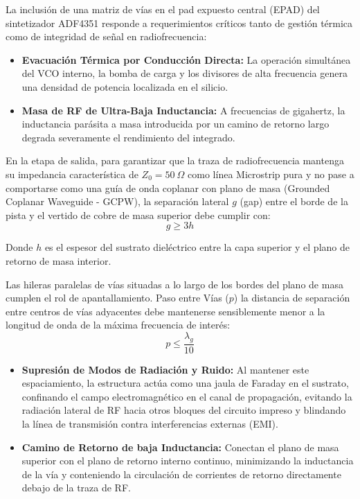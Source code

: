 \documentclass[11pt,a4paper,twoside]{report}
\begin{document}
	La inclusión de una matriz de vías en el pad expuesto central (EPAD) del sintetizador ADF4351 responde a requerimientos críticos tanto de gestión térmica como de integridad de señal en radiofrecuencia:
	\begin{itemize}
		\item \textbf{Evacuación Térmica por Conducción Directa:} La operación simultánea del VCO interno, la bomba de carga y los divisores de alta frecuencia genera una densidad de potencia localizada en el silicio.
		\item \textbf{Masa de RF de Ultra-Baja Inductancia:} A frecuencias de gigahertz, la inductancia parásita a masa introducida por un camino de retorno largo degrada severamente el rendimiento del integrado.
	\end{itemize}

	En la etapa de salida, para garantizar que la traza de radiofrecuencia mantenga su impedancia característica de $Z_0 = 50\ \Omega$ como línea Microstrip pura y no pase a comportarse como una guía de onda coplanar con plano de masa (Grounded Coplanar Waveguide - GCPW), la separación lateral $g$ (gap) entre el borde de la pista y el vertido de cobre de masa superior debe cumplir con:
	\begin{equation}
		g \ge 3h
	\end{equation}
	
	Donde $h$ es el espesor del sustrato dieléctrico entre la capa superior y el plano de retorno de masa interior.\newpage
	
	Las hileras paralelas de vías situadas a lo largo de los bordes del plano de masa cumplen el rol de apantallamiento. Paso entre Vías ($p$) la distancia de separación entre centros de vías adyacentes debe mantenerse sensiblemente menor a la longitud de onda de la máxima frecuencia de interés:
	\begin{equation}
			p \le \frac{\lambda_{g}}{10}
	\end{equation}

	\begin{itemize}
		\item \textbf{Supresión de Modos de Radiación y Ruido:} Al mantener este espaciamiento, la estructura actúa como una jaula de Faraday en el sustrato, confinando el campo electromagnético en el canal de propagación, evitando la radiación lateral de RF hacia otros bloques del circuito impreso y blindando la línea de transmisión contra interferencias externas (EMI).
		\item \textbf{Camino de Retorno de baja Inductancia:} Conectan el plano de masa superior con el plano de retorno interno continuo, minimizando la inductancia de la vía y conteniendo la circulación de corrientes de retorno directamente debajo de la traza de RF.
	\end{itemize}
	
\end{document}
